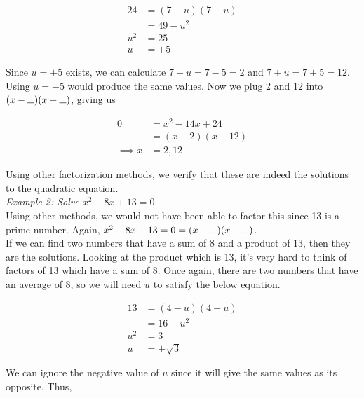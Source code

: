         \begin{align*}
            24  &= (7-u)(7+u) \\
            &= 49 - u^2 \\
            u^2 &= 25 \\
            u   &= \pm 5
        \end{align*}

        \noindent Since $u = \pm 5$ exists, we can calculate $7-u = 7-5 = 2$ and $7+u=7+5=12$.
        Using $u=-5$ would produce the same values. Now we plug 2 and 12 into
        $(x-\longunderscore)(x-\longunderscore)$, giving us

        \begin{align*}
            0          &= x^2-14x+24 \\
            &= (x-2)(x-12) \\
            \implies x &= 2,12
        \end{align*}

        \noindent Using other factorization methods, we verify that these are indeed the solutions
        to the quadratic equation. \\

        \noindent \color{blue} \textit{Example 2: Solve $x^2-8x+13=0$} \color{black} \\
        Using other methods, we would not have been able to factor this since 13 is a prime number.
        Again, $x^2-8x+13 = 0 = (x-\longunderscore)(x-\longunderscore)$. \\

        \noindent If we can find two numbers that have a sum of 8 and a product of 13, then they
        are the solutions. Looking at the product which is 13, it's very hard to think of factors
        of 13 which have a sum of 8. Once again, there are two numbers that have an average of 8,
        so we will need $u$ to satisfy the below equation.

        \begin{align*}
            13  &= (4-u)(4+u) \\
            &= 16 - u^2 \\
            u^2 &= 3 \\
            u   &= \pm \sqrt{3}
        \end{align*}

        \noindent We can ignore the negative value of $u$ since it will give the same values as its
        opposite. Thus, \\


